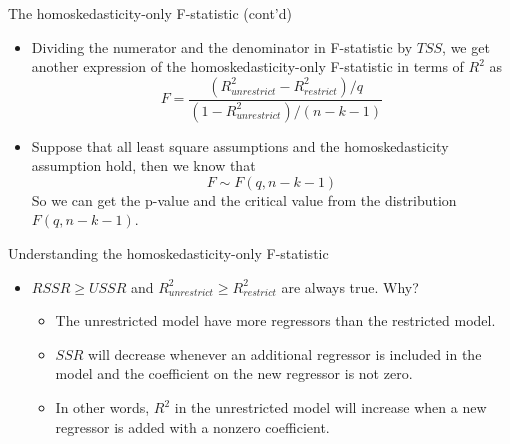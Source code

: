 \documentclass[presentation,10pt]{beamer}
\begin{document}
\begin{frame}[label={sec:org661a07f}]{The homoskedasticity-only F-statistic (cont'd)}
\begin{itemize}
\item Dividing the numerator and the denominator in F-statistic by \(TSS\),
we get another expression of the homoskedasticity-only F-statistic
in terms of \(R^2\) as
\begin{equation}
\label{eq:ftest-hm-r}
F = \frac{(R^2_{unrestrict} - R^2_{restrict})/q}{(1 - R^2_{unrestrict})/(n-k-1)}
\end{equation}

\item Suppose that all least square assumptions and the homoskedasticity
assumption hold, then we know that
\[ F \sim F(q, n-k-1) \]
So we can get the p-value and the critical value from the
distribution \(F(q, n-k-1)\).
\end{itemize}
\end{frame}

\begin{frame}[label={sec:orgbe2ea16}]{Understanding the homoskedasticity-only F-statistic}
\begin{itemize}
\item \(RSSR \geq USSR\) and \(R^2_{unrestrict} \geq R^2_{restrict}\)
are always true. Why?

\begin{itemize}
\item The unrestricted model have more regressors than the restricted
model.

\vspace{0.2cm}

\item \(SSR\) will decrease whenever an additional regressor is included
in the model and the coefficient on the new regressor is not
zero.

\vspace{0.2cm}

\item In other words, \(R^2\) in the unrestricted model will increase when
a new regressor is added with a nonzero coefficient.
\end{itemize}
\end{itemize}
\end{frame}
\end{document}
